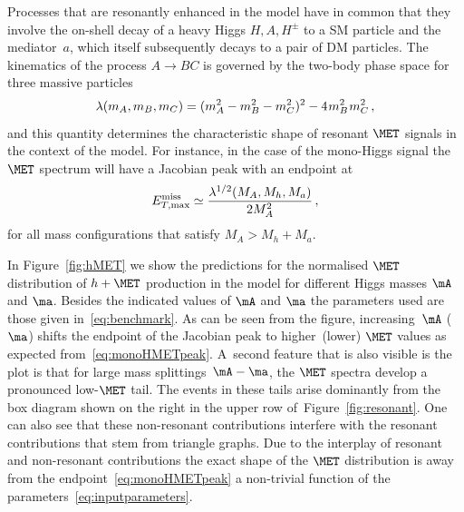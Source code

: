 Processes that are resonantly enhanced in the \hdma model have in common that they involve the on-shell decay of a heavy Higgs $H,A,H^\pm$ to a SM particle and the mediator~$a$, which   itself  subsequently decays to a pair of DM particles. The kinematics of the process $A \to B C$ is governed by the two-body phase space for three massive particles 
\begin{equation} \label{eq:twophasespace}
\lambda(m_A, m_B, m_C) = (m_A^2 -m_B^2-m_C^2)^2 -  4 \hspace{0.25mm} m_B^2 \hspace{0.25mm}  m_C^2 \,,
\end{equation}
and this quantity determines the characteristic shape of resonant $\MET$ signals in the context of the \hdma model. For instance, in the case of the mono-Higgs signal the $\MET$ spectrum  will have a Jacobian peak with an endpoint at~\cite{No:2015xqa,Bauer:2017ota}
\begin{equation} \label{eq:monoHMETpeak}
E^{\rm{miss}}_{T, {\rm max} } \simeq \frac{\lambda^{1/2}(M_A, M_h, M_a)}{2 M_A^2}\,, 
\end{equation}
for all mass configurations that satisfy $M_A > M_h + M_a$. 

In Figure~\ref{fig:hMET} we show the predictions for the normalised $\MET$ distribution of $h+\MET$ production in the \hdma model for different Higgs masses $\mA$ and $\ma$. Besides the indicated values of $\mA$ and $\ma$ the parameters  used  are those given in~\eqref{eq:benchmark}. As can be seen from the figure,  increasing~$\mA$ ($\ma$) shifts the endpoint of the Jacobian peak to higher~(lower) $\MET$  values as expected from~\eqref{eq:monoHMETpeak}. A~second feature that is also visible is  the plot is that for large mass splittings~$\mA - \ma$, the $\MET$ spectra develop a pronounced low-$\MET$ tail. The events in these tails arise dominantly from the box diagram shown on the right in the upper row of~Figure~\ref{fig:resonant}. One can also see that these non-resonant contributions interfere with the resonant contributions that stem from triangle graphs. Due to the interplay of resonant and non-resonant contributions  the exact shape of the $\MET$ distribution is   away from the endpoint~\eqref{eq:monoHMETpeak} a non-trivial function of the \hdma parameters~\eqref{eq:inputparameters}.  

